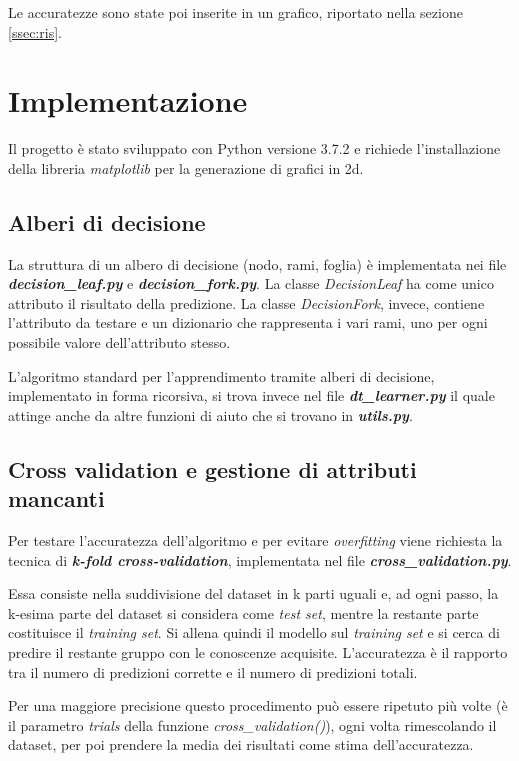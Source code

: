 \documentclass[a4paper,12pt]{article}
\begin{document}
Le accuratezze sono state poi inserite in un grafico, riportato nella sezione \ref{ssec:ris}.

\section{Implementazione}
Il progetto è stato sviluppato con Python versione 3.7.2 e richiede l'installazione della libreria
\textit{matplotlib} per la generazione di grafici in 2d.

\subsection{Alberi di decisione}
La struttura di un albero di decisione (nodo, rami, foglia) è implementata nei file
\textit{\textbf{decision\_leaf.py}} e \textit{\textbf{decision\_fork.py}}. La classe \textit{DecisionLeaf} ha come unico attributo il risultato della predizione. La classe \textit{DecisionFork}, invece, contiene l'attributo da testare e un dizionario che rappresenta i vari rami, uno per ogni possibile valore dell'attributo stesso.
\newline

L'algoritmo standard per l'apprendimento tramite alberi di decisione, implementato in forma ricorsiva, si trova invece nel
file \textit{\textbf{dt\_learner.py}} il quale attinge anche da altre funzioni di aiuto che si trovano in \textit{\textbf{utils.py}}.

\subsection{Cross validation e gestione di attributi mancanti} \label{ssec:cval}
Per testare l'accuratezza dell'algoritmo e per evitare \textit{overfitting} viene richiesta la tecnica di \textit{\textbf{k-fold cross-validation}}, implementata nel file
\textit{\textbf{cross\_validation.py}}.

 Essa consiste nella suddivisione del dataset in k parti uguali e, ad ogni passo, la k-esima parte del dataset si considera come \textit{test set}, mentre la restante parte costituisce il \textit{training set}. Si allena quindi il modello sul \textit{training set} e si cerca di predire il restante gruppo con le conoscenze acquisite. L'accuratezza è il rapporto tra il numero di predizioni corrette e il numero di predizioni totali.
 \newline

Per una maggiore precisione questo procedimento può essere ripetuto più volte (è il parametro \textit{trials} della funzione \textit{cross\_validation()}), ogni volta rimescolando il dataset, per poi prendere la media dei risultati come stima dell'accuratezza.
\newline
\end{document}
